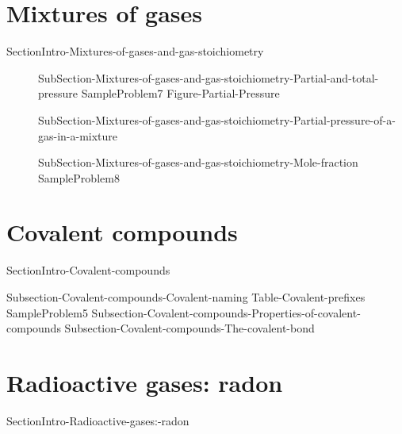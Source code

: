 \documentclass[main.tex]{subfiles}
\newcommand\chapterlabel{ChMIX-biomoleculesinsolution}\setcounter{figurenewcounter}{0}\setcounter{tablenewcounter}{0}\setcounter{formulanewcounter}{0}
\begin{document}
 
 \section{\faTint Mixtures of gases  }{SectionIntro-Mixtures-of-gases-and-gas-stoichiometry}
\sloppy 
\begin{description}
 \item[] 
{SubSection-Mixtures-of-gases-and-gas-stoichiometry-Partial-and-total-pressure}
{SampleProblem7}
 {Figure-Partial-Pressure}
\item[]  {SubSection-Mixtures-of-gases-and-gas-stoichiometry-Partial-pressure-of-a-gas-in-a-mixture}
\item[]  {SubSection-Mixtures-of-gases-and-gas-stoichiometry-Mole-fraction}
{SampleProblem8}
\end{description}





 



\renewcommand\chapterlabel{Ch-naming}
\section{\faEnvira Covalent compounds}
{SectionIntro-Covalent-compounds}
\sloppy \begin{description}
{Subsection-Covalent-compounds-Covalent-naming}
 {Table-Covalent-prefixes}	
{SampleProblem5}
{Subsection-Covalent-compounds-Properties-of-covalent-compounds}
{Subsection-Covalent-compounds-The-covalent-bond}
\end{description}



\renewcommand\chapterlabel{Ch-nuclear}
\section{\faFlash Radioactive gases: radon}
{SectionIntro-Radioactive-gases:-radon}
\end{document}
